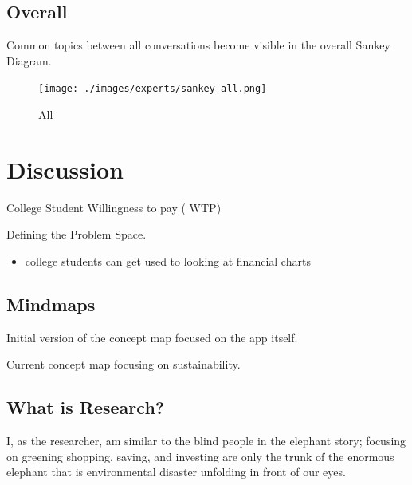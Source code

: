 \documentclass[
  letterpaper,
  DIV=11,
  numbers=noendperiod]{scrartcl}
\providecommand{\tightlist}{%
  \setlength{\itemsep}{0pt}\setlength{\parskip}{0pt}}\usepackage{longtable,booktabs,array}
\begin{document}
\subsection{Overall}\label{overall}

Common topics between all conversations become visible in the overall
Sankey Diagram.

\begin{figure}[H]

{\centering \texttt{[image: ./images/experts/sankey-all.png]}

}

\caption{All}

\end{figure}%

\newpage

\section{Discussion}\label{discussion}

College Student Willingness to pay ( WTP)

Defining the Problem Space.

\begin{itemize}
\tightlist
\item
  college students can get used to looking at financial charts
\end{itemize}

\subsection{Mindmaps}\label{mindmaps}

Initial version of the concept map focused on the app itself.

Current concept map focusing on sustainability.

\subsection{What is Research?}\label{what-is-research}

I, as the researcher, am similar to the blind people in the elephant
story; focusing on greening shopping, saving, and investing are only the
trunk of the enormous elephant that is environmental disaster unfolding
in front of our eyes.
\end{document}
